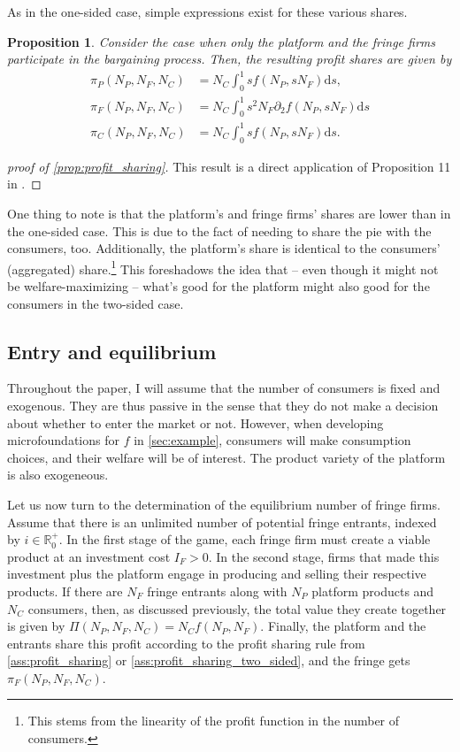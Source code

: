 \documentclass[a4paper]{article}
\newtheorem{proposition}{Proposition}
\newcommand{\ds}{\mathrm{d}s}
\begin{document}
As in the one-sided case, simple expressions exist for these various shares.
\begin{proposition}
    \label{prop:profit_sharing_two_sided}
    Consider the case when only the platform and the fringe firms participate in the bargaining process.
    Then, the resulting profit shares are given by
    \begin{align*}
        \pi_P(N_P, N_F, N_C) &= N_C \int_0^1 s f(N_P, s N_F) \ds, \\
        \pi_F(N_P, N_F, N_C) &= N_C \int_0^1 s^2 N_F \partial_2 f(N_P, s N_F) \ds \\
        \pi_C(N_P, N_F, N_C) &= N_C \int_0^1 s f(N_P, s N_F) \ds.
    \end{align*}
\end{proposition}
\begin{proof}[proof of \cref{prop:profit_sharing}]
    This result is a direct application of Proposition 11 in \textcite{stancsics2023value}.
\end{proof}
One thing to note is that the platform's and fringe firms' shares are lower than in the one-sided case.
This is due to the fact of needing to share the pie with the consumers, too.
Additionally, the platform's share is identical to the consumers' (aggregated) share.\footnote{
    This stems from the linearity of the profit function in the number of consumers.
}
This foreshadows the idea that -- even though it might not be welfare-maximizing -- what's good for the platform might also good for the consumers in the two-sided case.


\subsection{Entry and equilibrium}

Throughout the paper, I will assume that the number of consumers is fixed and exogenous.
They are thus passive in the sense that they do not make a decision about whether to enter the market or not.
However, when developing microfoundations for $f$ in \cref{sec:example}, consumers will make consumption choices, and their welfare will be of interest.
The product variety of the platform is also exogeneous.

Let us now turn to the determination of the equilibrium number of fringe firms.
Assume that there is an unlimited number of potential fringe entrants, indexed by $i \in \mathbb{R}^+_0$.
In the first stage of the game, each fringe firm must create a viable product at an investment cost $I_F > 0$.
In the second stage, firms that made this investment plus the platform engage in producing and selling their respective products.
If there are $N_F$ fringe entrants along with $N_P$ platform products and $N_C$ consumers, then, as discussed previously, the total value they create together is given by $\Pi(N_P, N_F, N_C) = N_C f(N_P, N_F)$.
Finally, the platform and the entrants share this profit according to the profit sharing rule from \cref{ass:profit_sharing} or \cref{ass:profit_sharing_two_sided}, and the fringe gets $\pi_F(N_P, N_F, N_C)$.
\end{document}
